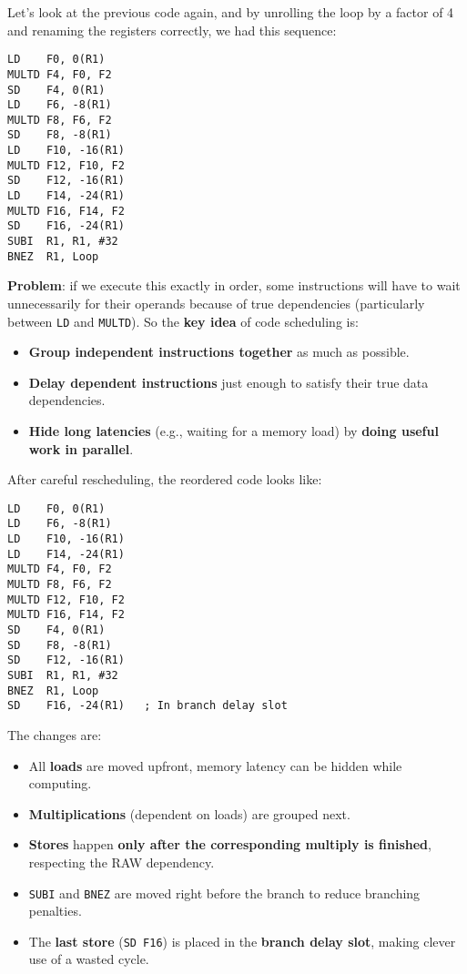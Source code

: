 \highspace
Let's look at the previous code again, and by unrolling the loop by a factor of 4 and renaming the registers correctly, we had this sequence:
\begin{lstlisting}[language=unknown]
LD    F0, 0(R1)
MULTD F4, F0, F2
SD    F4, 0(R1)
LD    F6, -8(R1)
MULTD F8, F6, F2
SD    F8, -8(R1)
LD    F10, -16(R1)
MULTD F12, F10, F2
SD    F12, -16(R1)
LD    F14, -24(R1)
MULTD F16, F14, F2
SD    F16, -24(R1)
SUBI  R1, R1, #32
BNEZ  R1, Loop
\end{lstlisting}
\textcolor{Red2}{ \textbf{Problem}}: if we execute this exactly in order, some instructions will have to wait unnecessarily for their operands because of true dependencies (particularly between \texttt{LD} and \texttt{MULTD}). So the \textbf{key idea} of code scheduling is:
\begin{itemize}
    \item \textbf{Group independent instructions together} as much as possible.
    \item \textbf{Delay dependent instructions} just enough to satisfy their true data dependencies.
    \item \textbf{Hide long latencies} (e.g., waiting for a memory load) by \textbf{doing useful work in parallel}.
\end{itemize}
After careful rescheduling, the reordered code looks like:
\begin{lstlisting}[language=unknown]
LD    F0, 0(R1)
LD    F6, -8(R1)
LD    F10, -16(R1)
LD    F14, -24(R1)
MULTD F4, F0, F2
MULTD F8, F6, F2
MULTD F12, F10, F2
MULTD F16, F14, F2
SD    F4, 0(R1)
SD    F8, -8(R1)
SD    F12, -16(R1)
SUBI  R1, R1, #32
BNEZ  R1, Loop
SD    F16, -24(R1)   ; In branch delay slot
\end{lstlisting}
The changes are:
\begin{itemize}
    \item All \textbf{loads} are moved upfront, memory latency can be hidden while computing.
    \item \textbf{Multiplications} (dependent on loads) are grouped next.
    \item \textbf{Stores} happen \textbf{only after the corresponding multiply is finished}, respecting the RAW dependency.
    \item \texttt{SUBI} and \texttt{BNEZ} are moved right before the branch to reduce branching penalties.
    \item The \textbf{last store} (\texttt{SD F16}) is placed in the \textbf{branch delay slot}, making clever use of a wasted cycle.
\end{itemize}
